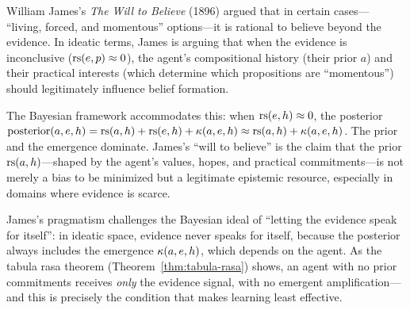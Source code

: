 \begin{remark}
William James's \emph{The Will to Believe} (1896) argued that in certain cases---
``living, forced, and momentous'' options---it is rational to believe beyond the
evidence. In ideatic terms, James is arguing that when the evidence is
inconclusive ($\mathrm{rs}(e, p) \approx 0$), the agent's compositional history (their
prior $a$) and their practical interests (which determine which propositions are
``momentous'') should legitimately influence belief formation.

The Bayesian framework accommodates this: when $\mathrm{rs}(e, h) \approx 0$, the posterior
$\mathrm{posterior}(a, e, h) = \mathrm{rs}(a, h) + \mathrm{rs}(e, h) + \kappa(a, e, h) \approx
\mathrm{rs}(a, h) + \kappa(a, e, h)$. The prior and the emergence dominate. James's
``will to believe'' is the claim that the prior $\mathrm{rs}(a, h)$---shaped by the agent's
values, hopes, and practical commitments---is not merely a bias to be minimized
but a legitimate epistemic resource, especially in domains where evidence is scarce.

James's pragmatism challenges the Bayesian ideal of ``letting the evidence speak
for itself'': in ideatic space, evidence never speaks for itself, because the
posterior always includes the emergence $\kappa(a, e, h)$, which depends on the
agent. As the tabula rasa theorem (Theorem~\ref{thm:tabula-rasa}) shows, an agent
with no prior commitments receives \emph{only} the evidence signal, with no
emergent amplification---and this is precisely the condition that makes learning
least effective.
\end{remark}

